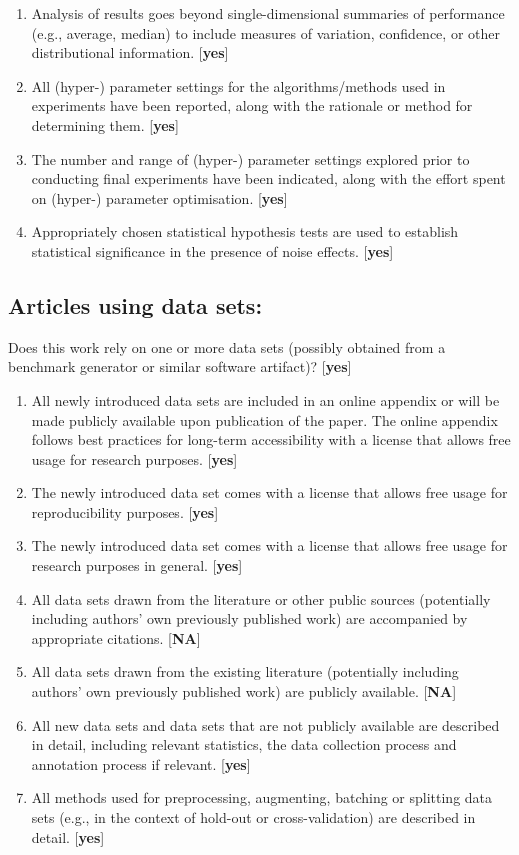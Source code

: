 \begin{enumerate}
  \item Analysis of results goes beyond single-dimensional summaries of performance (e.g., average, median) to include measures of variation, confidence, or other distributional information. [\textbf{yes}]
  \item All (hyper-) parameter settings for the algorithms/methods used in experiments have been reported, along with the rationale or method for determining them. [\textbf{yes}]
  \item The number and range of (hyper-) parameter settings explored prior to conducting final experiments have been indicated, along with the effort spent on (hyper-) parameter optimisation. [\textbf{yes}]
  \item Appropriately chosen statistical hypothesis tests are used to establish statistical significance in the presence of noise effects. [\textbf{yes}]
\end{enumerate}

\subsection*{Articles using data sets:}
Does this work rely on one or more data sets (possibly obtained from a benchmark generator or similar software artifact)? [\textbf{yes}]

\begin{enumerate}
  \item All newly introduced data sets are included in an online appendix or will be made publicly available upon publication of the paper. The online appendix follows best practices for long-term accessibility with a license that allows free usage for research purposes. [\textbf{yes}]
  \item The newly introduced data set comes with a license that allows free usage for reproducibility purposes. [\textbf{yes}]
  \item The newly introduced data set comes with a license that allows free usage for research purposes in general. [\textbf{yes}]
  \item All data sets drawn from the literature or other public sources (potentially including authors' own previously published work) are accompanied by appropriate citations. [\textbf{NA}]
  \item All data sets drawn from the existing literature (potentially including authors' own previously published work) are publicly available. [\textbf{NA}]
  \item All new data sets and data sets that are not publicly available are described in detail, including relevant statistics, the data collection process and annotation process if relevant. [\textbf{yes}]
  \item All methods used for preprocessing, augmenting, batching or splitting data sets (e.g., in the context of hold-out or cross-validation) are described in detail. [\textbf{yes}]
\end{enumerate}

